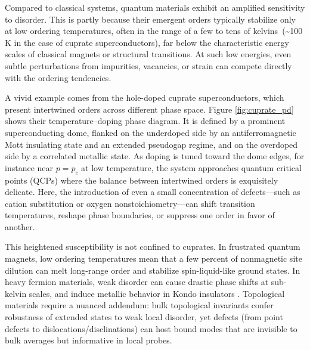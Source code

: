 Compared to classical systems, quantum materials exhibit an amplified sensitivity to disorder. This is partly because their emergent orders typically stabilize only at low ordering temperatures, often in the range of a few to tens of kelvins~(\textasciitilde100 K in the case of cuprate superconductors), far below the characteristic energy scales of classical magnets or structural transitions. At such low energies, even subtle perturbations from impurities, vacancies, or strain can compete directly with the ordering tendencies.

A vivid example comes from the hole-doped cuprate superconductors, which present intertwined orders across different phase space\cite{fradkinIntertwinedOrdersPhysics2025}. Figure \ref {fig:cuprate_pd} shows their temperature–doping phase diagram. It is defined by a prominent superconducting dome, flanked on the underdoped side by an antiferromagnetic Mott insulating state and an extended pseudogap regime, and on the overdoped side by a correlated metallic state. As doping is tuned toward the dome edges, for instance near $p=p_c$ at low temperature, the system approaches quantum critical points (QCPs) where the balance between intertwined orders is exquisitely delicate. Here, the introduction of even a small concentration of defects—such as cation substitution or oxygen nonstoichiometry—can shift transition temperatures, reshape phase boundaries, or suppress one order in favor of another.

This heightened susceptibility is not confined to cuprates. In frustrated quantum magnets, low ordering temperatures mean that a few percent of nonmagnetic site dilution can melt long-range order and stabilize spin-liquid-like ground states\cite{syzranovEffectVacancyDefects2022}. In heavy fermion materials, weak disorder can cause drastic phase shifts at sub-kelvin scales\cite{toldinDisorderQuasiparticleInterference2013}\cite{gegenwartQuantumCriticalityHeavyfermion2008}, and induce metallic behavior in Kondo insulators \cite{pirieVisualizingAtomicscaleOrigin2023}. Topological materials require a nuanced addendum: bulk topological invariants confer robustness of extended states to weak local disorder, yet defects (from point defects to dislocations/disclinations) can host bound modes that are invisible to bulk averages but informative in local probes\cite{yamadaBoundStatesPartial2022,xueObservationDislocationInducedTopological2021}. 

